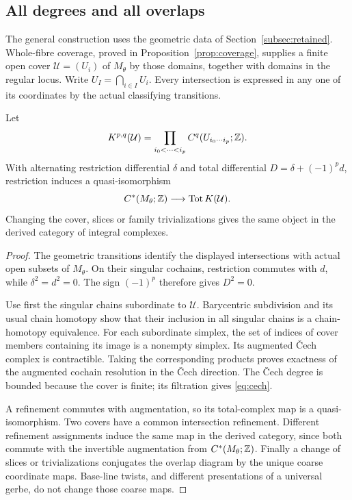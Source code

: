 \subsection{All degrees and all overlaps}\label{subsec:cochains}
The general construction uses the geometric data of
Section~\ref{subsec:retained}. Whole-fibre coverage, proved in
Proposition~\ref{prop:coverage}, supplies a finite open cover
\(\mathcal U=(U_i)\) of \(M_\theta\) by those domains, together with
domains in the regular locus. Write \(U_I=\bigcap_{i\in I}U_i\).
Every intersection is expressed in any one of its coordinates by
the actual classifying transitions.

\begin{proposition}\label{prop:descent}
Let
\[
 K^{p,q}(\mathcal U)=
 \prod_{i_0<\cdots<i_p} C^q(U_{i_0\cdots i_p};\mathbb Z).
\]
With alternating restriction differential \(\delta\) and total
differential \(D=\delta+(-1)^p d\), restriction induces a
quasi-isomorphism
\begin{equation}\label{eq:cech}
 C^*(M_\theta;\mathbb Z)\longrightarrow\operatorname{Tot}K(\mathcal U).
\end{equation}
Changing the cover, slices or family trivializations gives the same
object in the derived category of integral complexes.
\end{proposition}

\begin{proof}
The geometric transitions identify the displayed intersections
with actual open subsets of \(M_\theta\). On their singular
cochains, restriction commutes with \(d\), while
\(\delta^2=d^2=0\). The sign \((-1)^p\) therefore gives
\(D^2=0\).

Use first the singular chains subordinate to \(\mathcal U\).
Barycentric subdivision and its usual chain homotopy show that their
inclusion in all singular chains is a chain-homotopy equivalence.
For each subordinate simplex, the set of indices of cover members
containing its image is a nonempty simplex. Its augmented Čech
complex is contractible. Taking the corresponding products proves
exactness of the augmented cochain resolution in the Čech direction.
The Čech degree is bounded because the cover is finite; its
filtration gives \eqref{eq:cech}.

A refinement commutes with augmentation, so its total-complex map
is a quasi-isomorphism. Two covers have a common intersection
refinement. Different refinement assignments induce the same map
in the derived category, since both commute with the invertible
augmentation from \(C^*(M_\theta;\mathbb Z)\). Finally a change of slices
or trivializations conjugates the overlap diagram by the unique
coarse coordinate maps. Base-line twists, and different presentations
of a universal gerbe, do not change those coarse maps.
\end{proof}

